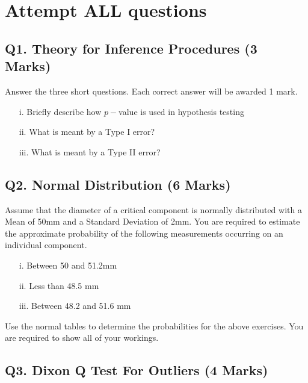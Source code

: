\documentclass[a4paper,12pt]{article}
\begin{document}
\section*{Attempt ALL questions}

\bigskip
\subsection*{Q1. Theory for Inference Procedures (3 Marks)}
Answer the three short questions. Each correct answer will be awarded 1 mark.
\begin{itemize}
\item[i.] Briefly describe how $p-$value is used in hypothesis testing
\item[ii.] What is meant by a Type I error?
\item[iii.] What is meant by a Type II error?
\end{itemize}
%


\subsection*{Q2. Normal Distribution (6 Marks)} %
Assume that the diameter of a critical component is normally distributed with a Mean of 50mm and a Standard Deviation of 2mm. You are required  to estimate the approximate probability of the following measurements occurring on an individual component.
\begin{itemize}
	\item [i.]	Between 50 and 51.2mm
	\item [ii.] Less than 48.5 mm
	\item [iii.] Between 48.2 and 51.6 mm
\end{itemize}

\noindent Use the normal tables to determine the probabilities for the above exercises. You are required to show all of your workings.

\subsection*{Q3. Dixon Q Test For Outliers (4 Marks)}
\end{document}
